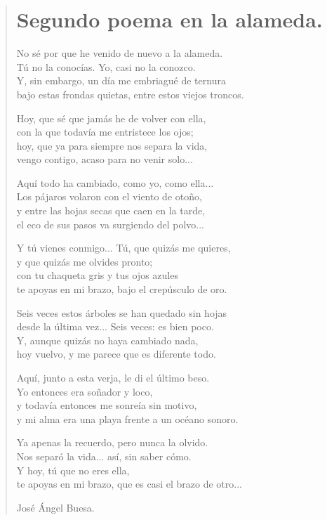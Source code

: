 \documentclass[11pt, portrait, twoside, notitlepage, openright]{book}
\begin{document}
\newpage
\begin{verse}
\begin{center}
\section{Segundo poema en la alameda.}
\end{center}
No sé por que he venido de nuevo a la alameda.\\
Tú no la conocías. Yo, casi no la conozco.\\
Y, sin embargo, un día me embriagué de ternura\\
bajo estas frondas quietas, entre estos viejos troncos.
\newline

Hoy, que sé que jamás he de volver con ella,\\
con la que todavía me entristece los ojos;\\
hoy, que ya para siempre nos separa la vida,\\
vengo contigo, acaso para no venir solo...
\newline

Aquí todo ha cambiado, como yo, como ella...\\
Los pájaros volaron con el viento de otoño,\\
y entre las hojas secas que caen en la tarde,\\
el eco de sus pasos va surgiendo del  polvo...
\newline

Y tú vienes conmigo... Tú, que quizás me quieres,\\
y que quizás me olvides pronto;\\
con tu chaqueta gris y tus ojos azules\\
te apoyas en mi brazo, bajo el crepúsculo de oro.
\newline

Seis veces estos árboles se han quedado sin hojas\\
desde la última vez... Seis veces: es bien poco.\\
Y, aunque quizás no haya cambiado nada,\\
hoy vuelvo, y me parece que es diferente todo.
\newpage

Aquí, junto a esta verja, le di el último beso.\\
Yo entonces era soñador y loco,\\
y todavía entonces me sonreía sin motivo,\\
y mi alma era una playa frente a un océano sonoro.
\newline

Ya apenas la recuerdo, pero nunca la olvido.\\
Nos separó la vida... así, sin saber cómo.\\
Y hoy, tú que no eres ella,\\
te apoyas en mi brazo, que es casi el brazo de otro...
\newline

José Ángel Buesa.
\end{verse}
\end{document}
